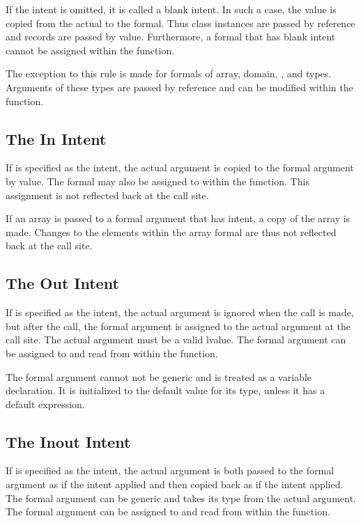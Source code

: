 If the intent is omitted, it is called a blank intent.  In such a
case, the value is copied from the actual to the formal.  Thus
class instances are passed by reference and records are passed by value.
Furthermore, a formal that has blank intent
cannot be assigned within the function.

The exception to this rule is made for formals of array, domain, ,
and  types. Arguments of these types are passed by reference
and can be modified within the function.

\subsection{The In Intent}
\label{The_In_Intent}

If  is specified as the intent, the actual argument is copied
to the formal argument by value.
The formal may also be assigned to within
the function.  This assignment is not reflected back at the call site.

If an array is passed to a formal argument that has  intent,
a copy of the array is made.  Changes to the elements
within the array formal are thus not reflected back at the call site.

\subsection{The Out Intent}
\label{The_Out_Intent}

If  is specified as the intent, the actual argument is
ignored when the call is made, but after the call, the formal argument
is assigned to the actual argument at the call site.  The actual
argument must be a valid lvalue.  The formal argument can be assigned
to and read from within the function.

The formal argument cannot not be generic and is treated as a variable
declaration. It is initialized to the default value for its type,
unless it has a default expression.

\subsection{The Inout Intent}
\label{The_Inout_Intent}

If  is specified as the intent, the actual argument is
both passed to the formal argument as if the  intent applied
and then copied back as if the  intent applied.  The formal
argument can be generic and takes its type from the actual argument.
The formal argument can be assigned to and read from within the
function.


